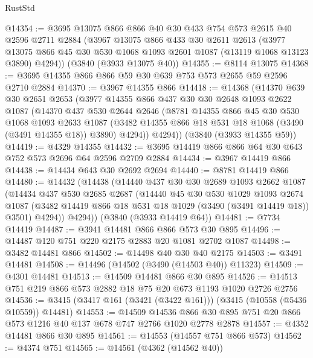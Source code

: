 \begin{lexlean}{RustStd}
\begin{coremodule}
@14354 := @3695
    @13075
    @866
    @866
    @40
    @30
    @433
    @754
    @573
    @2615
    @40
    @2596
    @2711
    @2884
    (@3967
      @13075
      @866
      @433
      @30
      @2611
      @2613
      (@3977 @13075 @866 @45 @30 @530 @1068 @1093 @2601 @1087 (@13119 @1068 @13123 @3890) @4294))
    (@3840 (@3933 @13075 @40))
@14355 := @8114 @13075
@14368 := @3695 @14355 @866 @866 @59 @30 @639 @753 @573 @2655 @59 @2596 @2710 @2884
@14370 := @3967 @14355 @866
@14418 := @14368
    (@14370
      @639
      @30
      @2651
      @2653
      (@3977
        @14355
        @866
        @437
        @30
        @30
        @2648
        @1093
        @2622
        @1087
        (@14370
          @437
          @530
          @2644
          @2646
          (@8781
            @14355
            @866
            @45
            @30
            @530
            @1068
            @1093
            @2633
            @1087
            (@3482 @14355 @866 @18 @531 @18 @1068 (@3490 (@3491 @14355 @18)) @3890)
            @4294))
        @4294))
    (@3840 (@3933 @14355 @59))
@14419 := @4329 @14355
@14432 := @3695 @14419 @866 @866 @64 @30 @643 @752 @573 @2696 @64 @2596 @2709 @2884
@14434 := @3967 @14419 @866
@14438 := @14434 @643 @30 @2692 @2694
@14440 := @8781 @14419 @866
@14480 := @14432
    (@14438
      (@14440
        @437
        @30
        @30
        @2689
        @1093
        @2662
        @1087
        (@14434
          @437
          @530
          @2685
          @2687
          (@14440
            @45
            @30
            @530
            @1029
            @1093
            @2674
            @1087
            (@3482 @14419 @866 @18 @531 @18 @1029 (@3490 (@3491 @14419 @18)) @3501)
            @4294))
        @4294))
    (@3840 (@3933 @14419 @64))
@14481 := @7734 @14419
@14487 := @3941 @14481 @866 @866 @573 @30 @895
@14496 := @14487 @120 @751 @220 @2175 @2883 @20 @1081 @2702 @1087
@14498 := @3482 @14481 @866
@14502 := @14498 @40 @30 @40 @2175
@14503 := @3491 @14481
@14508 := @14496 (@14502 (@3490 (@14503 @40)) @11323)
@14509 := @4301 @14481
@14513 := @14509 @14481 @866 @30 @895
@14526 := @14513 @751 @219 @866 @573 @2882 @18 @75 @20 @673 @1193 @1020 @2726 @2756
@14536 := @3415 (@3417 @161 (@3421 (@3422 @161))) (@3415 (@10558 (@5436 @10559)) @14481)
@14553 := @14509
    @14536
    @866
    @30
    @895
    @751
    @20
    @866
    @573
    @1216
    @40
    @137
    @678
    @747
    @2766
    @1020
    @2778
    @2878
@14557 := @4352 @14481 @866 @30 @895
@14561 := @14553 (@14557 @751 @866 @573)
@14562 := @4374 @751
@14565 := @14561 (@4362 (@14562 @40))

\end{coremodule}
\end{lexlean}
